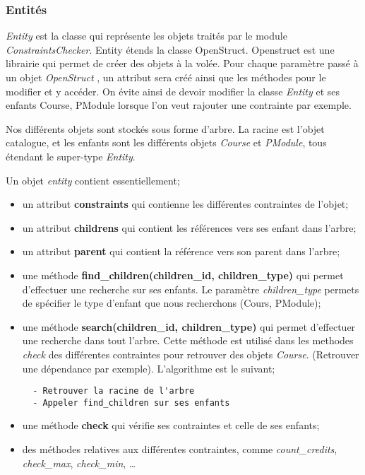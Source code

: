 \subsubsection{Entités}
\textit{Entity} est la classe qui représente les objets traités par le module \textit{ConstraintsChecker}. Entity étends la classe OpenStruct. Openstruct est une librairie qui permet de créer des objets à la volée. Pour chaque paramètre passé à un objet \textit{OpenStruct} \cite{OpenStruct}, un attribut sera créé ainsi que les méthodes pour le modifier et y accéder. On évite ainsi de devoir modifier la classe \textit{Entity} et ses enfants {Course, PModule} lorsque l'on veut rajouter une contrainte par exemple.

Nos différents objets sont stockés sous forme d'arbre. La racine est l'objet catalogue, et les enfants sont les différents objets \textit{Course} et \textit{PModule}, tous étendant le super-type \textit{Entity}.

Un objet \textit{entity} contient essentiellement;

\begin{itemize}
  \item un attribut \textbf{constraints} qui contienne les différentes contraintes de l'objet;
  \item un attribut \textbf{childrens} qui contient les références vers ses enfant dans l'arbre;
  \item un attribut \textbf{parent} qui contient la référence vers son parent dans l'arbre;
  \item une méthode \textbf{find\_children(children\_id, children\_type)} qui permet d'effectuer une recherche sur ses enfants. Le paramètre \textit{children\_type} permets de spécifier le type d'enfant que nous recherchons (Cours, PModule);
  \item une méthode \textbf{search(children\_id, children\_type)} qui permet d'effectuer une recherche dans tout l'arbre. Cette méthode est utilisé dans les methodes \textit{check} des différentes contraintes pour retrouver des objets \textit{Course}. (Retrouver une dépendance par exemple). L'algorithme est le suivant;
  \begin{lstlisting}
  - Retrouver la racine de l'arbre
  - Appeler find_children sur ses enfants
  \end{lstlisting}
  \item une méthode \textbf{check} qui vérifie ses contraintes et celle de ses enfants;
  \item des méthodes relatives aux différentes contraintes, comme \textit{count\_credits}, \textit{check\_max}, \textit{check\_min}, \ldots
\end{itemize}

